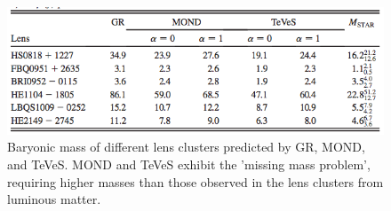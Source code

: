 \documentclass[12pt]{article}
\begin{document}
\begin{figure}
\centering
\includegraphics[width=6in]{tevesclustertab.png}
\caption{Baryonic mass of different lens clusters predicted by GR, MOND, and TeVeS. MOND and TeVeS exhibit the 'missing mass problem', requiring higher masses than those observed in the lens clusters from luminous matter. \cite{Mavromatos}}
\end{figure}
\end{document}
